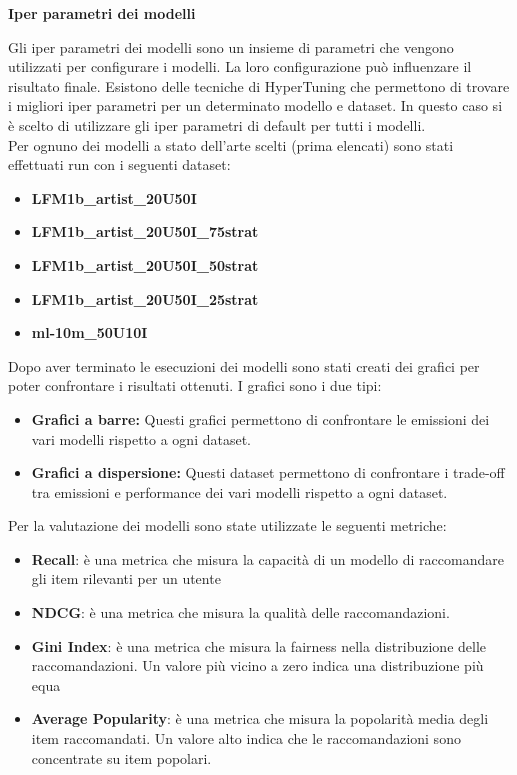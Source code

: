 \noindent \textbf{Iper parametri dei modelli}


\noindent Gli iper parametri dei modelli sono un insieme di parametri che vengono utilizzati per configurare i modelli. La loro configurazione può influenzare il risultato finale. Esistono delle tecniche di HyperTuning che permettono di trovare i migliori iper parametri per un determinato modello e dataset.
In questo caso si è scelto di utilizzare gli iper parametri di default per tutti i modelli.\\Per ognuno dei modelli a stato dell'arte scelti (prima elencati) sono stati effettuati run con i seguenti dataset:
\begin{itemize}
    \item \textbf{LFM1b\_artist\_20U50I}
    \item \textbf{LFM1b\_artist\_20U50I\_75strat}
    \item \textbf{LFM1b\_artist\_20U50I\_50strat}
    \item \textbf{LFM1b\_artist\_20U50I\_25strat}
    \item \textbf{ml-10m\_50U10I}
\end{itemize}

\noindent Dopo aver terminato le esecuzioni dei modelli sono stati creati dei grafici per poter confrontare i risultati ottenuti. I grafici sono i due tipi:
\begin{itemize}
    \item \textbf{Grafici a barre:} Questi grafici permettono di confrontare le emissioni dei vari modelli rispetto a ogni dataset.
    \item \textbf{Grafici a dispersione:} Questi dataset permettono di confrontare i trade-off tra emissioni e performance dei vari modelli rispetto a ogni dataset.
\end{itemize}

\noindent Per la valutazione dei modelli sono state utilizzate le seguenti metriche:
\begin{itemize}
    \item \textbf{Recall}: è una metrica che misura la capacità di un modello di raccomandare gli item rilevanti per un utente
    \item \textbf{NDCG}: è una metrica che misura la qualità delle raccomandazioni.
    \item \textbf{Gini Index}: è una metrica che misura la fairness nella distribuzione delle raccomandazioni. Un valore più vicino a zero indica una distribuzione più equa
    \item \textbf{Average Popularity}: è una metrica che misura la popolarità media degli item raccomandati. Un valore alto indica che le raccomandazioni sono concentrate su item popolari.
\end{itemize}



